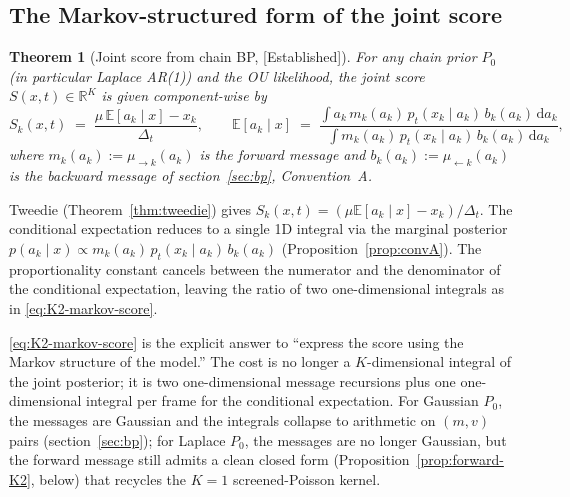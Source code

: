 \documentclass[11pt]{article}
\newtheorem{theorem}[proposition]{Theorem}
\theoremstyle{definition}
\newcommand{\R}{\mathbb{R}}
\newcommand{\E}{\mathbb{E}}
\newcommand{\Detl}{\Delta_t}
\newcommand{\score}{S(x, t)}
\newcommand{\Established}{\textcolor{black!50!green}{\textsf{[Established]}}}
\begin{document}
\subsection{The Markov-structured form of the joint score}\label{sec:K2-markov-score}

\begin{theorem}[Joint score from chain BP, \Established]
\label{thm:K2-markov-score}
For any chain prior \(P_0\) (in particular Laplace AR(1)) and the OU
likelihood, the joint score \(\score \in \R^K\) is given component-wise by
\begin{equation}\label{eq:K2-markov-score}
    S_k(x, t) \;=\; \frac{\mu\, \E[a_k \mid x] - x_k}{\Detl},
    \qquad
    \E[a_k \mid x] \;=\; \frac{\int a_k\, m_k(a_k)\, p_t(x_k \mid a_k)\,
                                 b_k(a_k)\, \mathrm da_k}
                              {\int m_k(a_k)\, p_t(x_k \mid a_k)\,
                                 b_k(a_k)\, \mathrm da_k},
\end{equation}
where \(m_k(a_k) := \mu_{\to k}(a_k)\) is the forward message and
\(b_k(a_k) := \mu_{\leftarrow k}(a_k)\) is the backward message of
section~\ref{sec:bp}, Convention~A.
\end{theorem}

\begin{derivation}
Tweedie (Theorem~\ref{thm:tweedie}) gives
\(S_k(x, t) = (\mu \E[a_k \mid x] - x_k) / \Detl\). The conditional
expectation reduces to a single 1D integral via the marginal posterior
\(p(a_k \mid x) \propto m_k(a_k)\, p_t(x_k \mid a_k)\, b_k(a_k)\)
(Proposition~\ref{prop:convA}). The proportionality constant cancels
between the numerator and the denominator of the conditional
expectation, leaving the ratio of two one-dimensional integrals as
in \eqref{eq:K2-markov-score}.
\end{derivation}

\begin{intuition}
\eqref{eq:K2-markov-score} is the explicit answer to ``express the
score using the Markov structure of the model.'' The cost is no
longer a \(K\)-dimensional integral of the joint posterior; it is two
one-dimensional message recursions plus one one-dimensional integral
per frame for the conditional expectation. For Gaussian
\(P_0\), the messages are Gaussian and the integrals collapse to
arithmetic on \((m, v)\) pairs (section~\ref{sec:bp}); for Laplace
\(P_0\), the messages are no longer Gaussian, but the
forward message still admits a clean closed form
(Proposition~\ref{prop:forward-K2}, below) that recycles the \(K = 1\)
screened-Poisson kernel.
\end{intuition}
\end{document}
